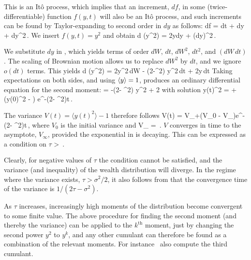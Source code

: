 This is an It\^o process, which implies that an increment, $df$, in some (twice-differentiable) function $f\left(y,t\right)$ will also be an It\^o process, and such increments can be found by Taylor-expanding to second order in $dy$ as follows:
\be
df =  dt +  dy +  dy^2\,.
\ee
We insert $f\left(y,t\right)=y^2$ and obtain
\be
d \left(y^2\right) = 2ydy + \left(dy\right)^2\,.
\ee

We substitute $dy$ in , which yields terms of order $dW$, $dt$, $dW^2$, $dt^2$, and $\left(dW\,dt\right)$. The scaling of Brownian motion allows us to replace $dW^2$ by $dt$, and we ignore $o\left(dt\right)$ terms. This yields
\bea
d \left(y^2\right) = 2\sigma y^2\,dW - \left(2\tau-\sigma^2\right) y^2\,dt + 2\tau y\,dt %
\eea
Taking expectations on both sides, and using $\left\langle y \right\rangle=1$, produces an ordinary differential equation for the second moment:
\be
{} = -\left(2\tau - \sigma^2\right) \langle y^2 \rangle + 2\tau
{}
\ee
with solution
\be
\langle y\left(t\right)^2 \rangle =  + \left(\langle y\left(0\right)^2 \rangle - \right) e^{-\left(2\tau - \sigma^2\right)t}\,.
\ee

The variance $V\left(t\right)=\langle y\left(t\right)^2 \rangle-1$ therefore follows
\be
V\left(t\right) = V_{\infty}+\left(V_0 - V_{\infty}\right)e^{-\left(2\tau - \sigma^2\right)t}\,,
\ee
where $V_0$ is the initial variance and
\be
V_{\infty} = \,.
\ee
$V$ converges in time to the asymptote, $V_{\infty}$, provided the exponential in  is decaying. 
This can be expressed as a condition on $\tau$
\be
\tau >  \,.
\ee

Clearly, for negative values of $\tau$ the condition cannot be satisfied, and the variance (and inequality) of the wealth distribution will diverge. 
In the regime where the variance exists, $\tau > \sigma^2/2$, it also follows from  that the convergence time of the variance is $1/\left(2\tau - \sigma^2\right)$.

As $\tau$ increases, increasingly high moments of the distribution become convergent to some finite value. 
The above procedure for finding the second moment (and thereby the variance) can be applied to the $k^\text{th}$ moment, just by changing the second power $y^2$ to $y^k$, and any other cumulant can therefore be found as a combination of the relevant moments. 
For instance~\cite{LiuSerota2016} also compute the third cumulant.

